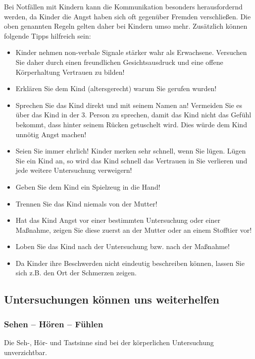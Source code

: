 Bei Notfällen mit Kindern kann die Kommunikation besonders herausfordernd werden, da Kinder die Angst haben sich oft gegenüber Fremden verschließen. Die oben genannten Regeln gelten daher bei Kindern umso mehr. Zusätzlich können folgende Tipps hilfreich sein:
\begin{itemize}
    \item Kinder nehmen non-verbale Signale stärker wahr als Erwachsene. Versuchen Sie daher durch einen freundlichen Gesichtsausdruck und eine offene Körperhaltung Vertrauen zu bilden!
    \item Erklären Sie dem Kind (altersgerecht) warum Sie gerufen wurden!
    \item Sprechen Sie das Kind direkt und mit seinem Namen an! Vermeiden Sie es über das Kind in der 3. Person zu sprechen, damit das Kind nicht das Gefühl bekommt, dass hinter seinem Rücken getuschelt wird. Dies würde dem Kind unnötig Angst machen!
    \item Seien Sie immer ehrlich! Kinder merken sehr schnell, wenn Sie lügen. Lügen Sie ein Kind an, so wird das Kind schnell das Vertrauen in Sie verlieren und jede weitere Untersuchung verweigern!
    \item Geben Sie dem Kind ein Spielzeug in die Hand!
    \item Trennen Sie das Kind niemals von der Mutter!
    \item Hat das Kind Angst vor einer bestimmten Untersuchung oder einer Maßnahme, zeigen Sie diese zuerst an der Mutter oder an einem Stofftier vor!
    \item Loben Sie das Kind nach der Untersuchung bzw. nach der Maßnahme!
    \item Da Kinder ihre Beschwerden nicht eindeutig beschreiben können, lassen Sie sich z.B. den Ort der Schmerzen zeigen.
\end{itemize}



\subsection{Untersuchungen können uns weiterhelfen}

\subsubsection{Sehen -- Hören -- Fühlen }
Die Seh-, Hör- und Tastsinne sind bei der körperlichen
Untersuchung unverzichtbar. 

